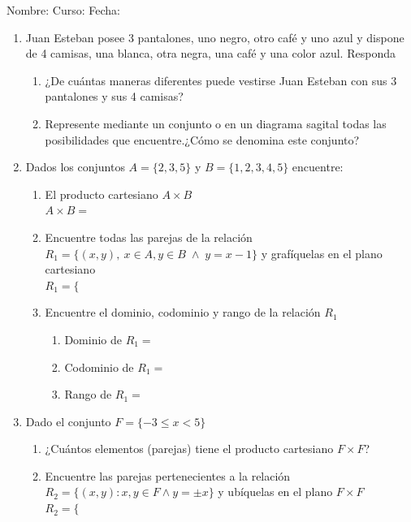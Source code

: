 \documentclass[letterpaper,fleqn]{article}
\newcommand{\LineaNombre}{%
\par
\vspace{\baselineskip}
Nombre:\hrulefill \; Curso: \underline{\hspace*{48pt}} \; Fecha: \underline{\hspace*{2.5cm}} \relax
\par}
\begin{document}
\LineaNombre
\begin{enumerate}
 \item Juan Esteban posee 3 pantalones, uno negro, otro café y uno azul y dispone de 4 camisas, una blanca, otra negra, una café y una color azul. Responda
 \begin{enumerate}
 \item ¿De cuántas maneras diferentes puede vestirse Juan Esteban con sus 3 pantalones y sus 4 camisas? \underline{\hspace{1in}}
 \item Represente mediante un conjunto o en un diagrama sagital todas las posibilidades que encuentre.¿Cómo se denomina este conjunto? \noanswer
\end{enumerate}
\item Dados los conjuntos $A=\{2,3,5\}$ y $B=\{1,2,3,4,5\}$ encuentre:
\begin{enumerate}
\item El producto cartesiano $A\times B$\\
$A \times B=$ \noanswer[.5in]
\item Encuentre todas las parejas de la relación $R_{1}=\{(x,y), \: x \in A, y \in B \; \wedge \; y=x-1\}$ y grafíquelas en el plano cartesiano\\

$R_{1}=\{$ \noanswer[.5in]
\newpage
\begin{center}

\end{center}
\item Encuentre el dominio, codominio y rango de la relación $R_{1}$
\begin{enumerate}
\item Dominio de $R_{1}=$
\item Codominio de $R_{1}=$
\item Rango de $R_{1}=$
\end{enumerate}
\end{enumerate}
\item Dado el conjunto $F=\{-3\leq x<5\}$
\begin{enumerate}
\item ¿Cuántos elementos (parejas) tiene el producto cartesiano $F\times F$? \underline{\hspace*{1in}}
\item Encuentre las parejas pertenecientes a la relación $R_{2}=\{(x,y): x,y \in F \wedge y=\pm x\}$ y ubíquelas en el plano $F\times F$\\
$R_{2}=\{$
\begin{center}

\end{center}
\end{enumerate}
 \end{enumerate}
\end{document}
